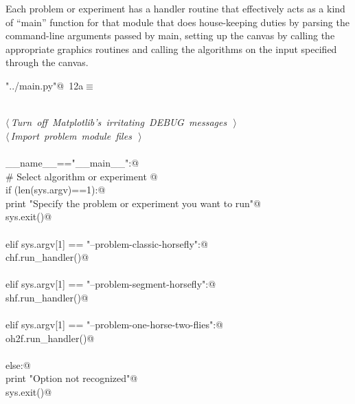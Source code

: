 \documentclass[11.5pt]{report}
\begin{document}
Each problem or experiment has a handler routine 
that effectively acts as a kind of ``main'' function for that module that 
does house-keeping duties by parsing the command-line arguments passed by main, 
setting up the canvas by calling the appropriate graphics routines and calling 
the algorithms on the input specified through the canvas. 

\begin{flushleft} \small
\begin{minipage}{\linewidth}\label{scrap1}\raggedright\small
{} \verb@"../main.py"@\nobreak\ {\footnotesize {12a}}$\equiv$
\vspace{-1ex}
\begin{list}{}{} \item
\mbox{}\verb@@\\
\mbox{}\verb@@\hbox{$\langle\,${\itshape Turn off Matplotlib's irritating DEBUG messages}\nobreak\ {\footnotesize {}}$\,\rangle$}\verb@@\\
\mbox{}\verb@@\hbox{$\langle\,${\itshape Import problem module files}\nobreak\ {\footnotesize {}}$\,\rangle$}\verb@@\\
\mbox{}\verb@@\\
\mbox{}\verb@if __name__=="__main__":@\\
\mbox{}\verb@     # Select algorithm or experiment @\\
\mbox{}\verb@     if (len(sys.argv)==1):@\\
\mbox{}\verb@          print "Specify the problem or experiment you want to run"@\\
\mbox{}\verb@          sys.exit()@\\
\mbox{}\verb@@\\
\mbox{}\verb@     elif sys.argv[1] == "--problem-classic-horsefly":@\\
\mbox{}\verb@          chf.run_handler()@\\
\mbox{}\verb@@\\
\mbox{}\verb@     elif sys.argv[1] == "--problem-segment-horsefly":@\\
\mbox{}\verb@          shf.run_handler()@\\
\mbox{}\verb@@\\
\mbox{}\verb@     elif sys.argv[1] == "--problem-one-horse-two-flies":@\\
\mbox{}\verb@          oh2f.run_handler()@\\
\mbox{}\verb@@\\
\mbox{}\verb@     else:@\\
\mbox{}\verb@          print "Option not recognized"@\\
\mbox{}\verb@          sys.exit()@\\
\mbox{}\verb@@{\NWsep}
\end{list}
\vspace{-1.5ex}
\footnotesize
\begin{list}{}{\setlength{\itemsep}{-\parsep}\setlength{\itemindent}{-\leftmargin}}

\item{}
\end{list}
\end{minipage}\vspace{4ex}
\end{flushleft}
\end{document}
